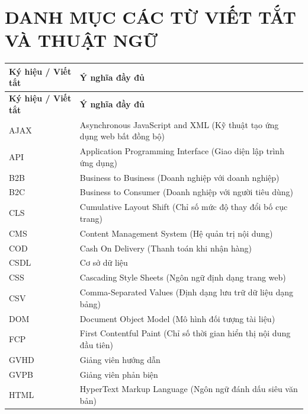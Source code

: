 \chapter*{DANH MỤC CÁC TỪ VIẾT TẮT VÀ THUẬT NGỮ}

\begin{longtable}{>{\raggedright\arraybackslash}p{4.2cm} >{\raggedright\arraybackslash}p{10.3cm}}
    \toprule
    \textbf{Ký hiệu / Viết tắt} & \textbf{Ý nghĩa đầy đủ} \\
    \midrule
    \endfirsthead

    \toprule
    \textbf{Ký hiệu / Viết tắt} & \textbf{Ý nghĩa đầy đủ} \\
    \midrule
    \endhead

    AJAX & Asynchronous JavaScript and XML (Kỹ thuật tạo ứng dụng web bất đồng bộ) \\
    \addlinespace
    API & Application Programming Interface (Giao diện lập trình ứng dụng) \\
    \addlinespace
    B2B & Business to Business (Doanh nghiệp với doanh nghiệp) \\
    \addlinespace
    B2C & Business to Consumer (Doanh nghiệp với người tiêu dùng) \\
    \addlinespace
    CLS & Cumulative Layout Shift (Chỉ số mức độ thay đổi bố cục trang) \\
    \addlinespace
    CMS & Content Management System (Hệ quản trị nội dung) \\
    \addlinespace
    COD & Cash On Delivery (Thanh toán khi nhận hàng) \\
    \addlinespace
    CSDL & Cơ sở dữ liệu \\
    \addlinespace
    CSS & Cascading Style Sheets (Ngôn ngữ định dạng trang web) \\
    \addlinespace
    CSV & Comma-Separated Values (Định dạng lưu trữ dữ liệu dạng bảng) \\
    \addlinespace
    DOM & Document Object Model (Mô hình đối tượng tài liệu) \\
    \addlinespace
    FCP & First Contentful Paint (Chỉ số thời gian hiển thị nội dung đầu tiên) \\
    \addlinespace
    GVHD & Giảng viên hướng dẫn \\
    \addlinespace
    GVPB & Giảng viên phản biện \\
    \addlinespace
    HTML & HyperText Markup Language (Ngôn ngữ đánh dấu siêu văn bản) \\

\end{longtable}

